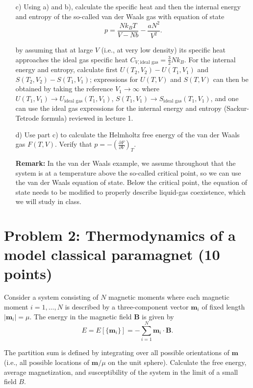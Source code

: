 \documentclass{article}
\begin{document}
\begin{enumerate}
    \item[c)] Using a) and b), calculate the specific heat and then the internal energy and entropy of the so-called van der Waals gas with equation of state
    \begin{equation}
        p = \frac{Nk_BT}{V - Nb} - \frac{aN^2}{V^2}. \label{eq:vdw_eq}
    \end{equation}
    
    by assuming that at large $V$ (i.e., at very low density) its specific heat approaches the ideal gas specific heat $C_{V,\text{ideal gas}} = \frac{3}{2}Nk_B$. For the internal energy and entropy, calculate first $U(T_2, V_2) - U(T_1, V_1)$ and $S(T_2, V_2) - S(T_1, V_1)$; expressions for $U(T, V)$ and $S(T, V)$ can then be obtained by
    taking the reference $V_1 \rightarrow \infty$ where $U(T_1, V_1) \rightarrow U_{\text{ideal gas}}(T_1, V_1)$, $S(T_1, V_1) \rightarrow S_{\text{ideal gas}}(T_1, V_1)$, and one can use the ideal gas expressions for the internal energy and entropy (Sackur-Tetrode formula) reviewed in lecture 1.

    \item[d)] Use part c) to calculate the Helmholtz free energy of the van der Waals gas $F(T, V)$. Verify that $p = -\left(\frac{\partial F}{\partial V}\right)_T$.

    \textbf{Remark:} In the van der Waals example, we assume throughout that the system is at a temperature above the so-called critical point, so we can use the van der Waals equation of state. Below the critical point, the equation of state needs to be modified to properly describe liquid-gas coexistence, which we will study in class.
\end{enumerate}

\section*{Problem 2: Thermodynamics of a model classical paramagnet (10 points)}

Consider a system consisting of $N$ magnetic moments where each magnetic moment $i = 1, \ldots, N$ is described by a three-component vector $\mathbf{m}_i$ of fixed length $|\mathbf{m}_i| = \mu$. The energy in the magnetic field $\mathbf{B}$ is given by
\begin{equation}
    E = E[\{\mathbf{m}_i\}] = -\sum_{i=1}^{N} \mathbf{m}_i \cdot \mathbf{B} . \label{eq:magnetic_energy}
\end{equation}

The partition sum is defined by integrating over all possible orientations of $\mathbf{m}$ (i.e., all possible locations of $\mathbf{m}/\mu$ on the unit sphere). Calculate the free energy, average magnetization, and susceptibility of the system in the limit of a small field $B$.
\end{document}
